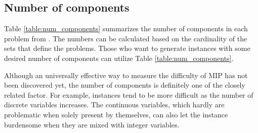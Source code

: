 \subsection{Number of components}
Table \ref{table:num_components} summarizes the number of components in each problem from \siplibtwo. The numbers can be calculated based on the cardinality of the sets that define the problems. Those who want to generate instances with some desired number of components can utilize Table \ref{table:num_components}.

Although an universally effective way to measure the difficulty of MIP has not been discovered yet, the number of components is definitely one of the closely related factor. For example, instances tend to be more difficult as the number of discrete variables increases. The continuous variables, which hardly are problematic when solely present by themselves, can also let the instance burdensome when they are mixed with integer variables. 

